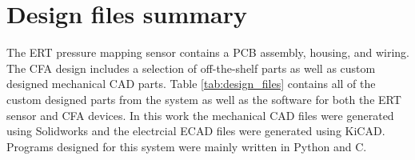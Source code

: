 
\section{Design files summary}
The ERT pressure mapping sensor contains a PCB assembly, housing, and wiring. The CFA design includes a selection of off-the-shelf parts as well as custom designed mechanical CAD parts. Table \ref{tab:design_files} contains all of the custom designed parts from the system as well as the software for both the ERT sensor and CFA devices. In this work the mechanical CAD files were generated using Solidworks and the electrcial ECAD files were generated using KiCAD. Programs designed for this system were mainly written in Python and C.

